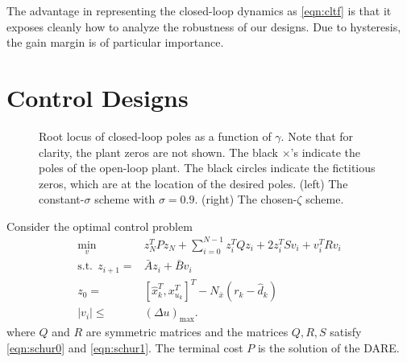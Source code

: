 \documentclass[twocolumn,twoside]{IEEEtran}
\newcommand{\Ad}{\ensuremath{\bar A }\xspace}
\newcommand{\Bd}{\ensuremath{\bar B }\xspace}
\begin{document}
The advantage in representing the closed-loop dynamics as \eqref{eqn:cltf} is that it exposes cleanly how to analyze the robustness of our designs. Due to hysteresis, the gain margin is of particular importance. 


%   


\section{Control Designs}\label{sec:tune}
\begin{figure*}
    \begin{subfigure}{0.48\textwidth}
  
\caption{}
  \label{fig:lqr_locus_cs}
\end{subfigure}
\hfill
\begin{subfigure}{0.48\textwidth}
  
  \caption{}
  \label{fig:lqr_locus_cz}
\end{subfigure}
\caption{Root locus of closed-loop poles as a function of $\gamma$. Note that for clarity, the plant zeros are not shown. The black $\times$'s indicate the poles of the open-loop plant. The black circles indicate the fictitious zeros, which are at the location of the desired poles. (left) The constant-$\sigma$ scheme with $\sigma=0.9$. (right) The chosen-$\zeta$ scheme.}
\label{fig:lqr_locus}
\end{figure*}

Consider the optimal control problem
\begin{subequations}
\begin{align}
\min_{v}\:\:& z^T_{N}Pz_{N} + \sum_{i=0}^{N-1}z_{i}^{T}Qz_{i} + 2z^T_iSv_i + v^{T}_{i}Rv_{i} \label{eqn:optcost}\\
  \text{s.t.}\:\:  z_{i+1} =& \Ad z_{i} + \Bd v_{i}\\
z_{0} =& [\hat{x}^T_{k}, x^T_{u_k}]^T - N_{\bar{x}}(r_k-\hat{d}_k)\\
|v_i | \leq& (\Delta u)_{\text{max}}.\label{eqn:cntrl_constraint}
\end{align}\label{eqn:optcon2}%
\end{subequations}
where $Q$ and $R$ are symmetric matrices and the matrices $Q,R,S$ satisfy \eqref{eqn:schur0} and \eqref{eqn:schur1}.
The terminal cost $P$ is the solution of the DARE. 
\end{document}

